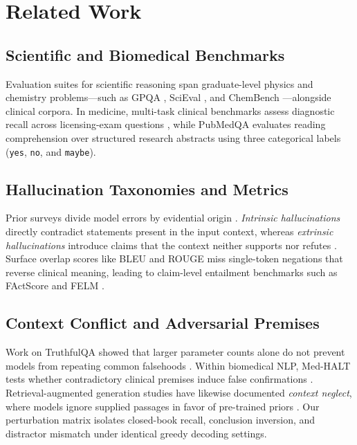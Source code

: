 \documentclass[10pt,twocolumn,letterpaper]{article}
\begin{document}
\section{Related Work}
\subsection{Scientific and Biomedical Benchmarks}
Evaluation suites for scientific reasoning span graduate-level physics and chemistry problems—such as GPQA \cite{rein2023gpqa}, SciEval \cite{sun2024scieval}, and ChemBench \cite{mirza2024superhuman}—alongside clinical corpora. In medicine, multi-task clinical benchmarks assess diagnostic recall across licensing-exam questions \cite{singhal2023large,singhal2023towards}, while PubMedQA \cite{jin2019pubmedqa} evaluates reading comprehension over structured research abstracts using three categorical labels (\texttt{yes}, \texttt{no}, and \texttt{maybe}).

\subsection{Hallucination Taxonomies and Metrics}
Prior surveys divide model errors by evidential origin \cite{huang2023survey,rawte2023survey}. \textit{Intrinsic hallucinations} directly contradict statements present in the input context, whereas \textit{extrinsic hallucinations} introduce claims that the context neither supports nor refutes \cite{ji2023survey}. Surface overlap scores like BLEU \cite{papineni2002bleu} and ROUGE \cite{lin2004rouge} miss single-token negations that reverse clinical meaning, leading to claim-level entailment benchmarks such as FActScore \cite{min2023factscore} and FELM \cite{chen2023felm}.

\subsection{Context Conflict and Adversarial Premises}
Work on TruthfulQA showed that larger parameter counts alone do not prevent models from repeating common falsehoods \cite{lin2022truthfulqa}. Within biomedical NLP, Med-HALT tests whether contradictory clinical premises induce false confirmations \cite{pal2023medhalt}. Retrieval-augmented generation studies have likewise documented \textit{context neglect}, where models ignore supplied passages in favor of pre-trained priors \cite{patel2024factuality}. Our perturbation matrix isolates closed-book recall, conclusion inversion, and distractor mismatch under identical greedy decoding settings.
\end{document}
